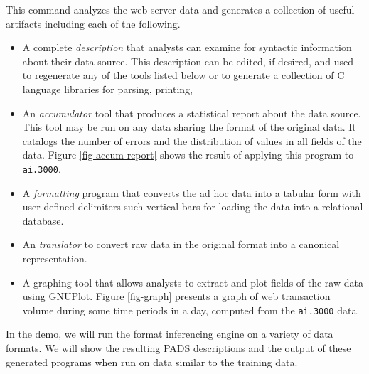 \documentclass[preprint]{sig-alternate-sigmod08}
\begin{document}
This command analyzes the web server data and generates a collection
of useful artifacts including each of the following.

\begin{itemize}
\item A complete {\em \pads{} description} that analysts can
examine for syntactic information about their data source.  This description 
can be edited, if desired, and used to regenerate any of the 
tools listed below or to generate a collection of C language libraries for 
parsing, printing, \etc
\item An {\em accumulator} tool
that produces a statistical report about the data source.  This
tool may be run on any data sharing the format of
the original data.  It catalogs the number of errors
and the distribution of values in all fields of the data.
Figure \ref{fig-accum-report} shows the result of applying this
program to {\tt ai.3000}.
\item A {\em formatting} program that converts
the ad hoc data into a tabular form with user-defined delimiters
such vertical bars for loading the data into a relational database.
\item An {\em \xml{} translator} to convert
raw data in the original format into a canonical \xml{} representation.  
\item A graphing tool that allows analysts to extract and plot fields
of the raw data using GNUPlot. Figure \ref{fig-graph} presents a graph of web
transaction volume during some time periods in a day, computed from
the {\tt ai.3000} data.
\end{itemize}
In the demo, we will run the format inferencing engine on a variety of
data formats.  We will show the resulting PADS descriptions and the
output of these generated programs when run on data similar to the
training data.
\end{document}
